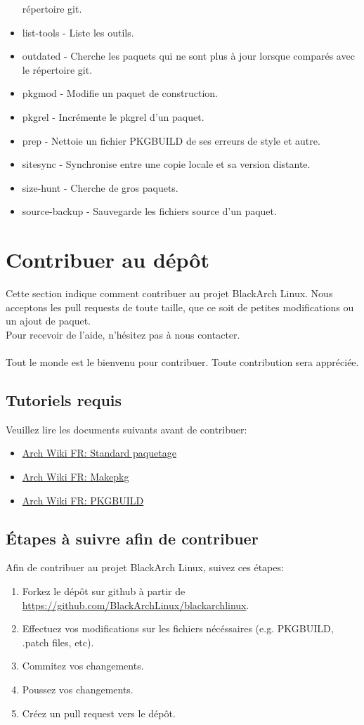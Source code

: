 \documentclass[a4paper, oneside, 11pt]{book}
\begin{document}
\begin{itemize}
répertoire git.
\item list-tools - Liste les outils.
\item outdated - Cherche les paquets qui ne sont plus à jour lorsque comparés
avec le répertoire git.
\item pkgmod - Modifie un paquet de construction.
\item pkgrel - Incrémente le pkgrel d'un paquet.
\item prep - Nettoie un fichier PKGBUILD de ses erreurs de style et autre.
\item sitesync - Synchronise entre une copie locale et sa version distante.
\item size-hunt - Cherche de gros paquets.
\item source-backup - Sauvegarde les fichiers source d'un paquet.
\end{itemize}

\section{Contribuer au dépôt}
Cette section indique comment contribuer au projet BlackArch Linux. Nous
acceptons les pull requests de toute taille, que ce soit de petites
modifications ou un ajout de paquet.\\Pour recevoir de l'aide, n'hésitez pas à
nous contacter.
\\\\
Tout le monde est le bienvenu pour contribuer. Toute contribution sera appréciée.

\subsection{Tutoriels requis}
Veuillez lire les documents suivants avant de contribuer:
\begin{itemize}
\item \href{http://wiki.archlinux.fr/Standard_paquetage}{Arch Wiki FR:
Standard paquetage}
\item \href{http://wiki.archlinux.fr/Makepkg}{Arch Wiki FR: Makepkg}
\item \href{http://wiki.archlinux.fr/PKGBUILD}{Arch Wiki FR: PKGBUILD}
\end{itemize}

\subsection{Étapes à suivre afin de contribuer}
Afin de contribuer au projet BlackArch Linux, suivez ces étapes:
\begin{enumerate}
\item Forkez le dépôt sur github à partir de
\url{https://github.com/BlackArchLinux/blackarchlinux}.
\item Effectuez vos modifications sur les fichiers nécéssaires (e.g. PKGBUILD,
.patch files, etc).
\item Commitez vos changements.
\item Poussez vos changements.
\item Créez un pull request vers le dépôt.
\end{enumerate}
\end{document}
